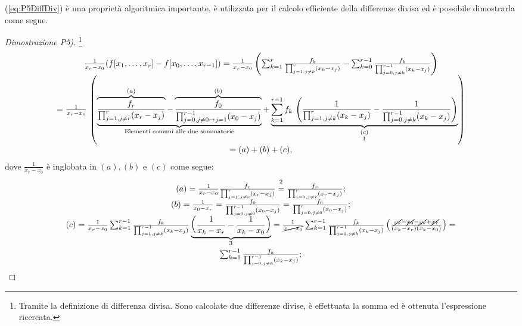 (\ref{eq:P5DiffDiv}) è  una proprietà algoritmica importante, è utilizzata per il calcolo efficiente della differenze divisa ed è possibile dimostrarla come segue.

\begin{proof}[Dimostrazione P5)] \footnote{Tramite la definizione di differenza divisa. Sono calcolate due differenze divise, è effettuata la somma ed è ottenuta l'espressione ricercata.}
    \begin{equation}\label{eq:dimPropDiffDiv}
        \begin{matrix}
            \frac{1}{x_r-x_0}(f[x_1,\hdots, x_r]-f[x_0,\hdots,x_{r-1}]) = \frac{1}{x_r-x_0}\left(\sum_{k=1}^r\frac{f_k}{\prod_{j=1,j\neq k}^r(x_k-x_j)}-\sum_{k=0}^{r-1}\frac{f_k}{\prod_{j=0,j\neq k}^{r-1}(x_k-x_j)}\right)\\
            = \frac{1}{x_r-x_0}\,\left(\underbrace{\overbrace{\frac{f_r}{\prod_{j=1,j\neq r}^r(x_r-x_j)}}^{(a)}-\overbrace{\frac{f_0}{\prod_{j=0,j\neq 0\rightarrow j=1}^{r-1}(x_0-x_j)}}^{(b)}}_{\text{Elementi comuni alle due sommatorie}}+\underbrace{\sum_{k=1}^{r-1}f_k\,\left(\frac{1}{\prod_{j=1,j\neq k}^r(x_k-x_j)}-\frac{1}{\prod_{j=0,j\neq k}^{r-1}(x_k-x_j)}\right)}_{\underset{\footnotemark}{(c)}}\right)\\
             =(a)+(b)+(c),
        \end{matrix}
    \end{equation}
    dove $\frac{1}{x_r-x_0}$ è inglobata in $(a),(b)$ e $(c)$ come segue:
    \begin{equation*} 
        \begin{matrix}
        (a) = \frac{1}{x_r-x_0}\frac{f_r}{\prod_{j=1,j\neq r}^r(x_r-x_j)}\overset{\footnotemark}{=}\frac{f_r}{\prod_{j=0,j\neq r}^r(x_r-x_j)};\\
        (b) = \frac{1}{x_0-x_r}=\frac{f_0}{\prod_{j=0,j\neq 0}^{r-1}(x_0-x_j)}=\frac{f_0}{\prod_{j=0,j\neq 0}^r(x_0-x_j)};\\
        (c) = \frac{1}{x_r-x_0}\sum_{k=1}^{r-1}\frac{f_k}{\prod_{j=1,j\neq k}^{r-1}(x_k-x_j)}\underbrace{\left(\frac{1}{x_k-x_r}-\frac{1}{x_k-x_0}\right)}_{\footnotemark}=
        \frac{1}{\cancel{x_r-x_0}}\sum_{k=1}^{r-1}\frac{f_k}{\prod_{j=1,j\neq k}^{r-1}(x_k-x_j)}\left(\frac{\cancel{x_k}-\cancel{x_0}-\cancel{x_k}+\cancel{x_r}}{(x_k-x_r)(x_k-x_0)}\right)=\\
        \sum_{k=1}^{r-1}\frac{f_k}{\prod_{j=0,j\neq k}^{r-1}(x_k-x_j)};
        \end{matrix}
    \end{equation*}
    \addtocounter{footnote}{-1}
    

\end{proof}
